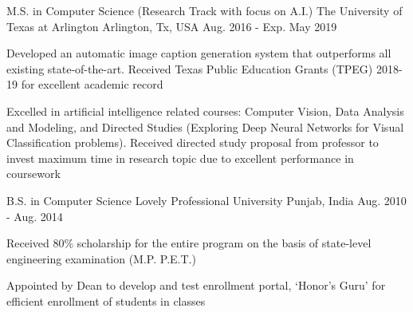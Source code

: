\vspace*{0.1in}
\begin{cventries}
\cventry
	{M.S. in Computer Science (Research Track with focus on A.I.)} %
    {The University of Texas at Arlington} %
    {Arlington, Tx, USA} %
    {Aug. 2016 - Exp. May 2019} %
    {
    	\begin{cvitems} %
        	\item {Developed an automatic image caption generation system that outperforms all existing state-of-the-art. Received Texas Public Education Grants (TPEG) 2018-19 for excellent academic record}
        	\item {Excelled in artificial intelligence related courses: Computer Vision, Data Analysis and Modeling, and Directed Studies (Exploring Deep Neural Networks for Visual Classification problems). Received directed study proposal from professor to invest maximum time in research topic due to excellent performance in coursework} \vspace*{0.04in}
    	\end{cvitems} 
    }
  \cventry
    {B.S. in Computer Science} %
    {Lovely Professional University} %
	{Punjab, India}
    {Aug. 2010 - Aug. 2014} %
    {
    	\begin{cvitems} %
        	\item {Received 80\% scholarship for the entire program on the basis of state-level engineering examination (M.P. P.E.T.)}
        	\item {Appointed by Dean to develop and test enrollment portal, `Honor's Guru' for efficient enrollment of students in classes} \vspace*{0.04in}
      	\end{cvitems}
    }  
\end{cventries}
